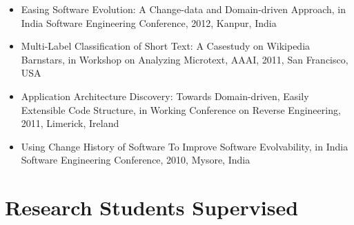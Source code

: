 \documentclass[letterpaper,11pt]{article}
\begin{document}
\begin{itemize}
  \vspace{0pt}\item\small{Easing Software Evolution: A Change-data and Domain-driven Approach, in India Software Engineering Conference, 2012, Kanpur, India}

  \vspace{0pt}\item\small{Multi-Label Classification of Short Text: A Casestudy on Wikipedia Barnstars, in Workshop on Analyzing Microtext, AAAI, 2011, San Francisco, USA}

  \vspace{0pt}\item\small{Application Architecture Discovery: Towards Domain-driven, Easily Extensible Code Structure, in Working Conference on Reverse Engineering, 2011, Limerick, Ireland}

  \vspace{0pt}\item\small{Using Change History of Software To Improve Software Evolvability, in India Software Engineering Conference, 2010, Mysore, India}

\end{itemize}
\newpage

\section{Research Students Supervised}
\end{document}
